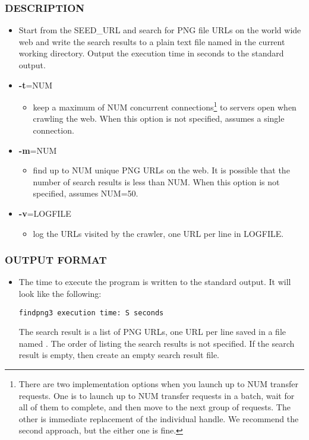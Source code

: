 \subsubsection*{DESCRIPTION}
\begin{itemize}
\item[]Start from the SEED\_URL and search for PNG file URLs on the world wide web and write the search results to a plain text file named  in the current working directory. Output the execution time in seconds to the standard output.
\item[] {\bf -t}=NUM
  \begin{itemize}
  \item[] keep a maximum of NUM concurrent connections\footnote{There are two implementation options when you launch up to NUM transfer requests. One is to launch up to NUM transfer requests in a batch, wait for all of them to complete, and then move to the next group of requests. The other is immediate replacement of the individual handle. We recommend the second approach, but the either one is fine.} to servers open when crawling the web. When this option is not specified, assumes a single connection. 
  \end{itemize}
\item[] {\bf -m}=NUM
  \begin{itemize}
  \item[] find up to NUM unique PNG URLs on the web. It is possible that the number of search results is less than NUM. When this option is not specified, assumes NUM=50. 
  \end{itemize}
\item[] {\bf -v}=LOGFILE
  \begin{itemize}
  \item[] log the URLs visited by the crawler, one URL per line in LOGFILE.
  \end{itemize}
\end{itemize}
\subsubsection*{OUTPUT FORMAT}
\begin{itemize}
\item[]The time to execute the program is written to the standard output. It will look like the following:
\begin{verbatim}
findpng3 execution time: S seconds
\end{verbatim}
  The search result is a list of PNG URLs, one URL per line saved in a file named . The order of listing the search results is not specified. If the search result is empty, then create an empty search result file.
\end{itemize}
